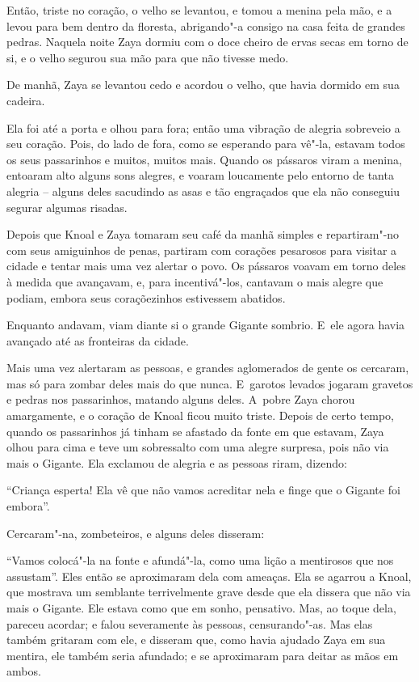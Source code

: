 Então, triste no coração, o velho se levantou, e tomou a menina pela
mão, e a levou para bem dentro da floresta, abrigando"-a consigo na casa
feita de grandes pedras. Naquela noite Zaya dormiu com o doce cheiro de
ervas secas em torno de si, e o velho segurou sua mão para que não
tivesse medo.

De manhã, Zaya se levantou cedo e acordou o velho, que havia dormido em
sua cadeira.

Ela foi até a porta e olhou para fora; então uma vibração de alegria
sobreveio a seu coração. Pois, do lado de fora, como se esperando para
vê"-la, estavam todos os seus passarinhos e muitos, muitos mais. Quando
os pássaros viram a menina, entoaram alto alguns sons alegres, e voaram
loucamente pelo entorno de tanta alegria -- alguns deles sacudindo as
asas e tão engraçados que ela não conseguiu segurar algumas risadas.

Depois que Knoal e Zaya tomaram seu café da manhã simples e
repartiram"-no com seus amiguinhos de penas, partiram com corações
pesarosos para visitar a cidade e tentar mais uma vez alertar o povo. Os
pássaros voavam em torno deles à medida que avançavam, e, para
incentivá"-los, cantavam o mais alegre que podiam, embora seus
coraçõezinhos estivessem abatidos.

Enquanto andavam, viam diante si o grande Gigante sombrio. E~ele agora
havia avançado até as fronteiras da cidade.

Mais uma vez alertaram as pessoas, e grandes aglomerados de gente os
cercaram, mas só para zombar deles mais do que nunca. E~garotos levados
jogaram gravetos e pedras nos passarinhos, matando alguns deles. A~pobre
Zaya chorou amargamente, e o coração de Knoal ficou muito triste. Depois
de certo tempo, quando os passarinhos já tinham se afastado da fonte em
que estavam, Zaya olhou para cima e teve um sobressalto com uma alegre
surpresa, pois não via mais o Gigante. Ela exclamou de alegria e as
pessoas riram, dizendo:

``Criança esperta! Ela vê que não vamos acreditar nela e finge que o
Gigante foi embora''.

Cercaram"-na, zombeteiros, e alguns deles disseram:

``Vamos colocá"-la na fonte e afundá"-la, como uma lição a mentirosos que
nos assustam''. Eles então se aproximaram dela com ameaças. Ela se
agarrou a Knoal, que mostrava um semblante terrivelmente grave desde que
ela dissera que não via mais o Gigante. Ele estava como que em sonho,
pensativo. Mas, ao toque dela, pareceu acordar; e falou severamente às
pessoas, censurando"-as. Mas elas também gritaram com ele, e disseram
que, como havia ajudado Zaya em sua mentira, ele também seria afundado;
e se aproximaram para deitar as mãos em ambos.


